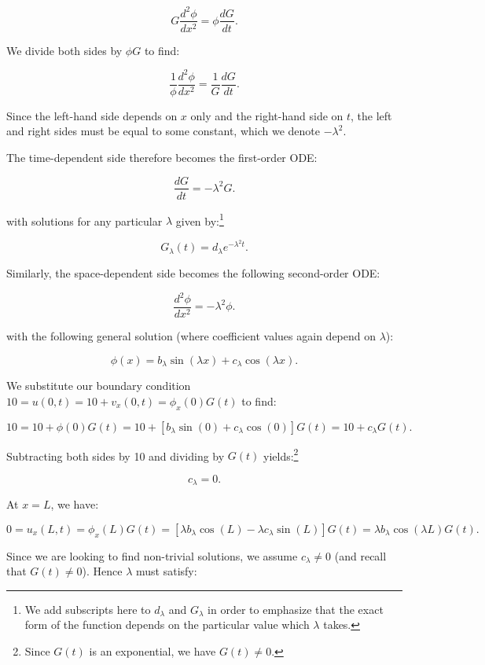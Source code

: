 \begin{solution}
    $$
    G \frac{d^2 \phi}{d x^2} = \phi \frac{d G}{d t}.
    $$

    \pagebreak
    We divide both sides by $\phi G$ to find:

    $$
    \frac{1}{\phi} \frac{d^2 \phi}{d x^2} = \frac{1}{G} \frac{d G}{d t}.
    $$

    Since the left-hand side depends on $x$ only and the right-hand side on $t$, the left and right sides must be equal
    to some constant, which we denote $-\lambda^2$.

    The time-dependent side therefore becomes the first-order ODE:

    $$
    \frac{d G}{d t} = -\lambda^2 G.
    $$

    with solutions for any particular $\lambda$ given by:\footnote{
        We add subscripts here to $d_{\lambda}$ and $G_{\lambda}$ in order to emphasize that the exact form of the 
        function depends on the particular value which $\lambda$ takes.
    }

    $$
    G_{\lambda}(t) = d_{\lambda}e^{-\lambda^2 t}.
    $$

    Similarly, the space-dependent side becomes the following second-order ODE:

    $$
    \frac{d^2 \phi}{d x^2} = -\lambda^2 \phi.
    $$

    with the following general solution (where coefficient values again depend on $\lambda$):

    $$
    \phi(x) = b_{\lambda} \sin{(\lambda x)} + c_{\lambda} \cos{(\lambda x)}.
    $$

    We substitute our boundary condition $10 = u(0, t) = 10 + v_x(0, t) = \phi_x(0) G(t)$ to find:

    $$
    10 = 10 + \phi(0) G(t) = 10 + \left[b_{\lambda} \sin{(0)} + c_{\lambda} \cos{(0)}\right] G(t) = 10 + c_{\lambda} G(t).
    $$

    Subtracting both sides by 10 and dividing by $G(t)$ yields:\footnote{
        Since $G(t)$ is an exponential, we have $G(t) \neq 0$.
    }

    $$
    c_{\lambda} = 0.
    $$

    At $x = L$, we have:

    $$
    0 = u_x(L, t) 
      = \phi_x(L) G(t) 
      = \left[\lambda b_{\lambda} \cos{(L)} - \lambda c_{\lambda} \sin{(L)}\right] G(t) 
      = \lambda b_{\lambda} \cos{(\lambda L)} G(t).
    $$

    Since we are looking to find non-trivial solutions, we assume $c_{\lambda} \neq 0$ (and recall that $G(t) \neq 0$).
    Hence $\lambda$ must satisfy:


\end{solution}
